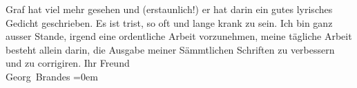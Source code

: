 \begin{ledgroupsized}[t]{13cm}
                    Graf hat viel mehr gesehen und (erstaunlich!) er hat darin ein gutes lyrisches
                    Gedicht geschrieben.\pend
           \pstart
           Es ist trist, so oft und lange krank zu sein. Ich bin ganz ausser Stande, irgend
                    eine ordentliche Arbeit vorzunehmen, meine tägliche Arbeit besteht allein darin,
                    die Ausgabe meiner Sämmtlichen
                        Schriften zu verbessern und zu corrigiren.\pend
           \pstart
           Ihr Freund{\\[\baselineskip]}\spacefill\mbox{Georg Brandes}\pend
           \leftskip=0em{}\endnumbering{}\end{ledgroupsized}  \newcommand{\dateiname}{L01033}\newcommand{\titel}{Georg Brandes an Arthur Schnitzler, 30. 4. 1900}\newcommand{\editorInnen}{Martin Anton Müller und Gerd-Hermann Susen}
            \footnotesize
\begin{ledgroupsized}[t]{11.5cm}
\end{ledgroupsized}
         
      